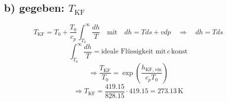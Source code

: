 \subsection*{b) gegeben: \( T_{\text{KF}} \)}

\[
T_{\text{KF}} = T_{\text{0}} + \frac{T_{\text{0}}}{c_p} \int_{T_{\text{0}}}^{\infty} \frac{dh}{T} \quad \text{mit} \quad dh = T ds + v dp \quad \Rightarrow \quad dh = T ds
\]
\[
\int_{T_{\text{0}}}^{\infty} \frac{dh}{T} = \text{ideale Flüssigkeit mit} \, c \, \text{konst}
\]
\[
\Rightarrow \frac{T_{\text{KF}}}{T_{\text{0}}} = \exp \left( \frac{h_{\text{KF, ein}}}{c_p T_{\text{0}}} \right)
\]
\[
\Rightarrow T_{\text{KF}} = \frac{419.15}{828.15} \cdot 419.15 = 273.13 \, \text{K}
\]